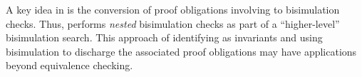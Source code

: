 A key idea in \toolName{} is the conversion of proof
obligations involving \recursiveRelations{} to
bisimulation checks. Thus, \toolName{} performs {\em nested}
bisimulation checks as part of a ``higher-level''
bisimulation search. This approach of
identifying \recursiveRelations{} as invariants and using
bisimulation to discharge the associated
proof obligations may have applications
beyond equivalence checking.
